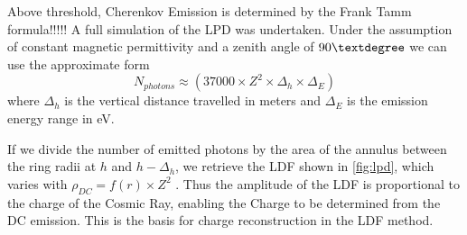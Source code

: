 \documentclass{article}
\begin{document}
Above threshold, Cherenkov Emission is determined by the Frank Tamm formula!!!!! A full simulation of the LPD was undertaken. Under the assumption of constant magnetic permittivity and a zenith angle of $90\textdegree$ we can use the approximate form \[ N_{photons} \approx (37000 \times Z^{2} \times \Delta_{h} \times \Delta_{E})\] where $\Delta_{h}$ is the vertical distance travelled in meters and $\Delta_{E}$ is the emission energy range in eV.

If we divide the number of emitted photons by the area of the annulus between the ring radii at $h$ and $h - \Delta_{h}$, we retrieve the LDF shown in \ref{fig:lpd}, which varies with $ \rho_{DC}  = f(r) \times Z^{2}$ . Thus the amplitude of the LDF is proportional to the charge of the Cosmic Ray, enabling the Charge to be determined from the DC emission. This is the basis for charge reconstruction in the LDF method.
\end{document}
